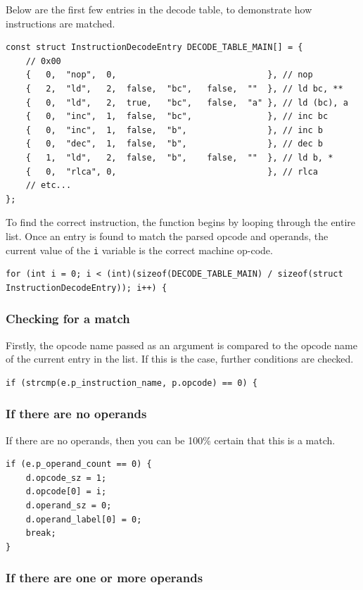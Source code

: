 \documentclass[a4paper]{report}
\begin{document}
Below are the first few entries in the decode table, to demonstrate how
instructions are matched.

\begin{lstlisting}
const struct InstructionDecodeEntry DECODE_TABLE_MAIN[] = {
	// 0x00
	{	0,	"nop",	0,								}, // nop
	{	2,	"ld",	2,	false,	"bc",	false,	""	}, // ld bc, **
	{	0,	"ld",	2,	true,	"bc",	false,	"a"	}, // ld (bc), a
	{	0,	"inc",	1,	false,	"bc",				}, // inc bc
	{	0,	"inc",	1,	false,	"b",				}, // inc b
	{	0,	"dec",	1,	false,	"b",				}, // dec b
	{	1,	"ld",	2,	false,	"b",	false,	""	}, // ld b, *
	{	0,	"rlca",	0,								}, // rlca
	// etc...
};
\end{lstlisting}

To find the correct instruction, the function begins by looping through the
entire list. Once an entry is found to match the parsed opcode and operands,
the current value of the  \texttt{i} variable is the correct machine op-code.

\begin{lstlisting}
for (int i = 0; i < (int)(sizeof(DECODE_TABLE_MAIN) / sizeof(struct InstructionDecodeEntry)); i++) {
\end{lstlisting}

\subsubsection{Checking for a match}

Firstly, the opcode name passed as an argument is compared to the opcode name of
the current entry in the list. If this is the case, further conditions are
checked.

\begin{lstlisting}
if (strcmp(e.p_instruction_name, p.opcode) == 0) {
\end{lstlisting}

\subsubsection{If there are no operands}

If there are no operands, then you can be 100\% certain that this is a match.

\begin{lstlisting}
if (e.p_operand_count == 0) {
	d.opcode_sz = 1;
	d.opcode[0] = i;
	d.operand_sz = 0;
	d.operand_label[0] = 0;
	break;
}
\end{lstlisting}

\subsubsection{If there are one or more operands}
\end{document}
